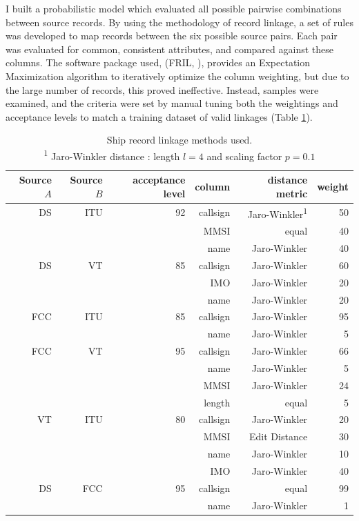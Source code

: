\documentclass[12pt,letterpaper]{article}
\begin{document}
I built a probabilistic model which evaluated all possible pairwise combinations between source records. By using the methodology of record linkage, a set of rules was developed to map records between the six possible source pairs. Each pair was evaluated for common, consistent attributes, and compared against these columns. The software package used, (FRIL, \citealp{Jurczyk2008fril}), provides an Expectation Maximization algorithm to iteratively optimize the column weighting, but due to the large number of records, this proved ineffective. Instead, samples were examined, and the criteria were set by manual tuning both the weightings and acceptance levels to match a training dataset of valid linkages (Table \ref{table:ships-record-linkage-methods}). 

\begin{table}[htbp]
  \begin{tabular}{rrrrrr} %
    \hline
    Source $A$ & Source $B$ & acceptance level & column & distance metric & weight \\
    \hline
     DS & ITU & 92 & callsign & Jaro-Winkler\textsuperscript{1} & 50 \\
        &     &    & MMSI & equal & 40 \\
        &     &    & name & Jaro-Winkler & 40 \\
     DS &  VT & 85 & callsign & Jaro-Winkler & 60 \\
        &     &    & IMO & Jaro-Winkler & 20 \\
        &     &    & name & Jaro-Winkler & 20 \\
    FCC & ITU & 85 & callsign & Jaro-Winkler & 95 \\
        &     &    & name & Jaro-Winkler & 5 \\
    FCC &  VT & 95 & callsign & Jaro-Winkler & 66 \\
        &     &    & name & Jaro-Winkler & 5 \\
        &     &    & MMSI & Jaro-Winkler & 24 \\
        &     &    & length & equal & 5 \\
     VT & ITU & 80 & callsign & Jaro-Winkler & 20 \\
        &     &    & MMSI & Edit Distance & 30 \\
        &     &    & name & Jaro-Winkler & 10 \\
        &     &    & IMO & Jaro-Winkler & 40 \\
     DS & FCC & 95 & callsign & equal & 99 \\
        &     &    & name & Jaro-Winkler& 1 \\
  \end{tabular}
  \caption{Ship record linkage methods used. \\
    \textsuperscript{1} Jaro-Winkler distance \citep{winkler1990string}: length $l = 4$ and scaling factor $p = 0.1$}
  \label{table:ships-record-linkage-methods}
\end{table}
\end{document}
